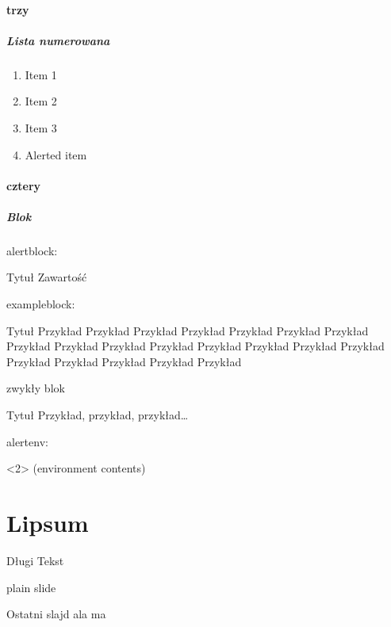 \documentclass[lualatex,aspectratio=54,12pt,]{beamer}
\begin{document}
\subsection{trzy}

\begin{frame}
 \frametitle{Lista numerowana}
 \Huge
 \begin{enumerate}
  \item
        Item 1
  \item
        Item 2
  \item
        Item 3
  \item
        \alert{Alerted item}
 \end{enumerate}
\end{frame}

\subsection{cztery}

\begin{frame}
 \frametitle{Blok}
 alertblock:
 \begin{alertblock}{Tytuł}
  Zawartość
 \end{alertblock}

 exampleblock:
 \begin{exampleblock}{Tytuł}
  Przykład Przykład Przykład Przykład Przykład Przykład Przykład Przykład Przykład Przykład Przykład Przykład Przykład Przykład Przykład Przykład Przykład Przykład Przykład Przykład
 \end{exampleblock}

 zwykły blok
 \begin{block}{Tytuł}
 Przykład, przykład, przykład…
 \end{block}

 alertenv:
 \begin{alertenv}<2>
  (environment contents)
 \end{alertenv}
\end{frame}

\part{Lipsum}

\begin{frame}
\partpage
\end{frame}

\begin{frame}[allowframebreaks=0.97]{Długi Tekst}
 \lipsum
\end{frame}

\begin{frame}[plain,c]
plain slide
\end{frame}

\begin{frame}{Ostatni slajd}
ala ma 
\end{frame}
\end{document}
